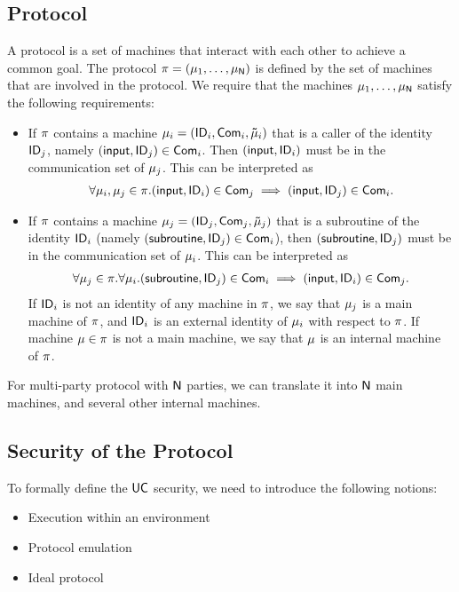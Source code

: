 \subsection{Protocol}
A protocol is a set of machines that interact with each other to achieve a common goal. The protocol $\mathsf{\pi} = (\mathsf{\mu}_1, \ldots, \mathsf{\mu}_{\mathsf{N}})$ is defined by the set of machines that are involved in the protocol. We require that the machines $\mathsf{\mu}_1, \ldots, \mathsf{\mu}_{\mathsf{N}}$ satisfy the following requirements:
\begin{itemize}
    \item If $\mathsf{\pi}$ contains a machine $\mathsf{\mu}_i = ({\mathsf{ID}}_i, \mathsf{Com}_i, \mathsf{\tilde{\mu}}_i)$ that is a caller of the identity ${\mathsf{ID}}_j$, namely $(\mathsf{input}, {\mathsf{ID}}_j) \in \mathsf{Com}_i$. Then $(\mathsf{input}, {\mathsf{ID}}_i)$ must be in the communication set of $\mathsf{\mu}_j$. This can be interpreted as 
    \begin{align*}
        \forall \mathsf{\mu}_i, \mathsf{\mu}_j \in \mathsf{\pi}. (\mathsf{input}, {\mathsf{ID}}_i) \in \mathsf{Com}_j \implies (\mathsf{input}, {\mathsf{ID}}_j) \in \mathsf{Com}_i.
    \end{align*}
    \item If $\mathsf{\pi}$ contains a machine $\mathsf{\mu}_j = ({\mathsf{ID}}_j, \mathsf{Com}_j, \mathsf{\tilde{\mu}}_j)$ that is a subroutine of the identity ${\mathsf{ID}}_i$ (namely $(\mathsf{subroutine}, {\mathsf{ID}}_j) \in \mathsf{Com}_i$), then $(\mathsf{subroutine}, {\mathsf{ID}}_j)$ must be in the communication set of $\mathsf{\mu}_i$. This can be interpreted as
    \begin{align*}
        \forall \mathsf{\mu}_j \in \mathsf{\pi}. \forall \mathsf{\mu}_i. (\mathsf{subroutine}, {\mathsf{ID}}_j) \in \mathsf{Com}_i \implies (\mathsf{input}, {\mathsf{ID}}_i) \in \mathsf{Com}_j. 
    \end{align*}
    If ${\mathsf{ID}}_i$ is not an identity of any machine in $\mathsf{\pi}$, we say that $\mathsf{\mu}_j$ is a main machine of $\mathsf{\pi}$, and ${\mathsf{ID}}_i$ is an external identity of $\mathsf{\mu}_i$ with respect to $\mathsf{\pi}$. If machine $\mathsf{\mu} \in \mathsf{\pi}$ is not a main machine, we say that $\mathsf{\mu}$ is an internal machine of $\mathsf{\pi}$.
\end{itemize}

For multi-party protocol with $\mathsf{N}$ parties, we can translate it into $\mathsf{N}$ main machines, and several other internal machines.

\subsection{Security of the Protocol}
To formally define the $\mathsf{UC}$ security, we need to introduce the following notions:
\begin{itemize}
    \item Execution within an environment
    \item Protocol emulation
    \item  Ideal protocol
\end{itemize}


